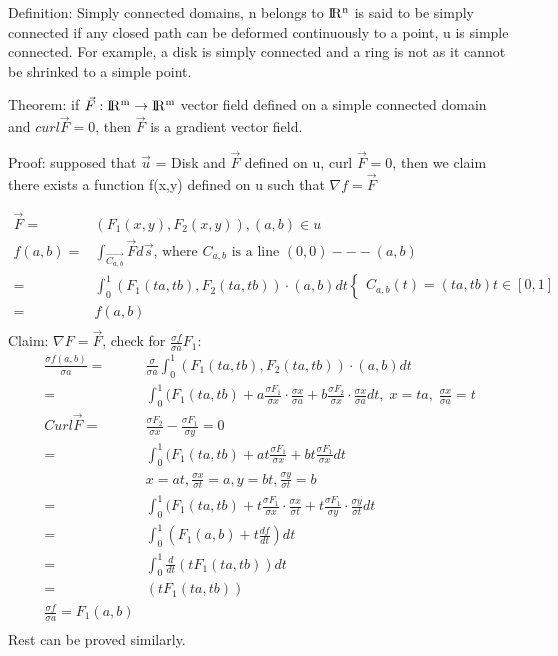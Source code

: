 \documentclass{article}
\newcommand{\R}{\rm I\!R}
\begin{document}
        Definition: Simply connected domains, n belongs to $\R^n$ is said to be simply connected if any closed path can be deformed continuously to a point, u is simple connected. For example, a disk is simply connected and a ring is not as it cannot be shrinked to a simple point.
        
        Theorem: if $\vec{F}:\R^m\rightarrow\R^m$ vector field defined on a simple connected domain and $curl\vec{F} = 0$, then $\vec{F}$ is a gradient vector field.
        
        Proof: supposed that $\vec{u}$ = Disk and $\vec{F}$ defined on u, curl $\vec{F} = 0$, then we claim there exists a function f(x,y) defined on u such that $\nabla f = \vec{F}$
        
        \begin{align}
            \vec{F} =& (F_1(x,y),F_2(x,y)), (a,b) \in u\\
            f(a,b) =& \int_{\vec{C_{a,b}}}\vec{F}d\vec{s}\text{, where }C_{a,b}\text{ is a line }(0,0)---(a,b)\\
            =&\int_0^1(F_1(ta,tb),F_2(ta,tb))\cdot(a,b)dt\begin{cases}C_{a,b}(t) = (ta,tb) t\in[0,1]\end{cases}\\
            =&f(a,b)\\
        \end{align}
        Claim: $\nabla F = \vec{F}$, check for $\frac{\sigma f}{\sigma a}F_1:$
        \begin{align}
            \frac{\sigma f(a,b)}{\sigma a} =& \frac{\sigma }{\sigma a}\int_0^1(F_1(ta,tb),F_2(ta,tb))\cdot(a,b)dt\\
            =& \int_0^1(F_1(ta,tb) + a\frac{\sigma F_1}{\sigma x}\cdot\frac{\sigma x}{\sigma a}+ b\frac{\sigma F_2}{\sigma x}\cdot\frac{\sigma x}{\sigma a} dt,\;x=ta,\;\frac{\sigma x}{\sigma a}=t\\
            Curl \vec{F} =& \frac{\sigma F_2}{\sigma x} - \frac{\sigma F_1}{\sigma y} = 0\\
            =& \int_0^1(F_1(ta,tb) + at\frac{\sigma F_1}{\sigma x}+ bt\frac{\sigma F_1}{\sigma x}dt\\
            &x=at, \frac{\sigma x}{\sigma t} = a, y = bt, \frac{\sigma y}{\sigma t} = b\\
            =&\int_0^1(F_1(ta,tb) + t\frac{\sigma F_1}{\sigma x}\cdot\frac{\sigma x}{\sigma t}+ t\frac{\sigma F_1}{\sigma y}\cdot\frac{\sigma y}{\sigma t} dt\\
            =&\int_0^1(F_1(a,b)+t \frac{df}{dt})dt\\
            =&\int_0^1\frac{d}{dt}(t F_1(ta,tb))dt\\
            =&(t F_1(ta,tb))\\
            \frac{\sigma f}{\sigma a} = F_1(a,b)\\
        \end{align}
        Rest can be proved similarly.
        
\end{document}
